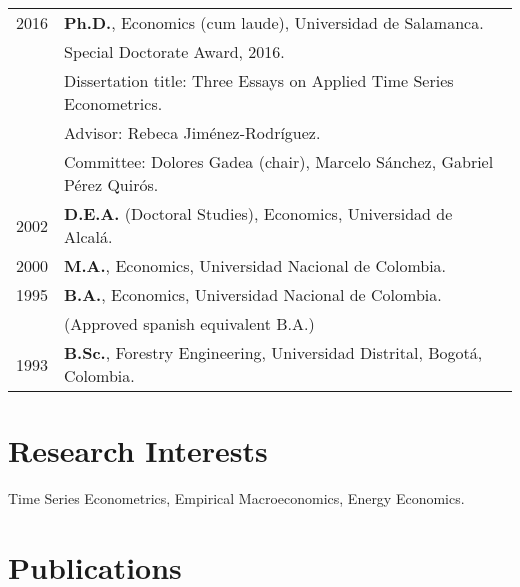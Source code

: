 \documentclass[11pt]{article}\usepackage[]{graphicx}\usepackage[]{color}
\begin{document}
\begin{tabular}{rl{-2cm}} %

2016 & \textbf{Ph.D.}, Economics (cum laude), Universidad de Salamanca.\\
\vspace{1pt}& Special Doctorate Award, 2016.\\
\vspace{1pt}& Dissertation title: Three Essays on Applied Time Series Econometrics.\\
\vspace{1pt}& Advisor: Rebeca Jiménez-Rodríguez.\\
\vspace{5pt}& Committee: Dolores Gadea (chair), Marcelo Sánchez, Gabriel Pérez Quirós.\\

\vspace{5pt}2002 & \textbf{D.E.A.} (Doctoral Studies), Economics, Universidad de Alcalá.\\

\vspace{5pt}2000 & \textbf{M.A.}, Economics, Universidad Nacional de Colombia.\\

1995 & \textbf{B.A.}, Economics, Universidad Nacional de Colombia.\\
\vspace{5pt}& (Approved spanish equivalent B.A.)\\

1993 & \textbf{B.Sc.}, Forestry Engineering, Universidad Distrital, Bogotá, Colombia.\\

\end{tabular}
\vspace{10pt}

\section{Research Interests}

Time Series Econometrics, Empirical Macroeconomics, Energy Economics.
\vspace{10pt}


\section{Publications}
\end{document}
